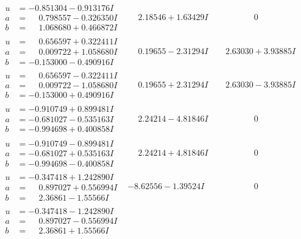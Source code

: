 \documentclass[1p]{elsarticle_modified}
\theoremstyle{definition}
\begin{document}
$$\begin{array}{c|c|c}
\begin{aligned}
u &= -0.851304 - 0.913176 I \\
a &= \phantom{-}0.798557 - 0.326350 I \\
b &= \phantom{-}1.068680 + 0.466872 I\end{aligned}
 & \phantom{-}2.18546 + 1.63429 I & \phantom{-0.000000 } 0 \\ \hline\begin{aligned}
u &= \phantom{-}0.656597 + 0.322411 I \\
a &= \phantom{-}0.009722 + 1.058680 I \\
b &= -0.153000 - 0.490916 I\end{aligned}
 & \phantom{-}0.19655 - 2.31294 I & \phantom{-}2.63030 + 3.93885 I \\ \hline\begin{aligned}
u &= \phantom{-}0.656597 - 0.322411 I \\
a &= \phantom{-}0.009722 - 1.058680 I \\
b &= -0.153000 + 0.490916 I\end{aligned}
 & \phantom{-}0.19655 + 2.31294 I & \phantom{-}2.63030 - 3.93885 I \\ \hline\begin{aligned}
u &= -0.910749 + 0.899481 I \\
a &= -0.681027 - 0.535163 I \\
b &= -0.994698 + 0.400858 I\end{aligned}
 & \phantom{-}2.24214 - 4.81846 I & \phantom{-0.000000 } 0 \\ \hline\begin{aligned}
u &= -0.910749 - 0.899481 I \\
a &= -0.681027 + 0.535163 I \\
b &= -0.994698 - 0.400858 I\end{aligned}
 & \phantom{-}2.24214 + 4.81846 I & \phantom{-0.000000 } 0 \\ \hline\begin{aligned}
u &= -0.347418 + 1.242890 I \\
a &= \phantom{-}0.897027 + 0.556994 I \\
b &= \phantom{-}2.36861 - 1.55566 I\end{aligned}
 & -8.62556 - 1.39524 I & \phantom{-0.000000 } 0 \\ \hline\begin{aligned}
u &= -0.347418 - 1.242890 I \\
a &= \phantom{-}0.897027 - 0.556994 I \\
b &= \phantom{-}2.36861 + 1.55566 I\end{aligned}

\end{array}$$
\end{document}
